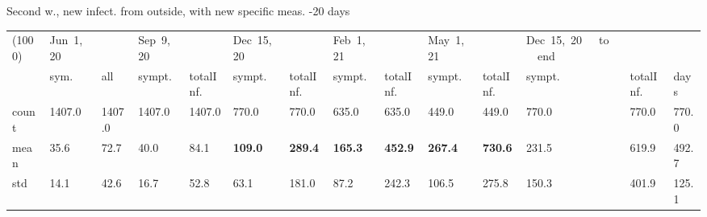 \documentclass[8pt]{beamer}
\begin{document}
\begin{frame}{Second w., new infect. from outside, with new specific meas. -20 days}
\begin{table}[H]
\center
\tiny
\begin{tabular}{p{0.3cm}p{0.3cm}p{0.3cm}p{0.3cm}p{0.3cm}p{0.3cm}p{0.3cm}p{0.3cm}p{0.3cm}p{0.3cm}p{0.3cm}p{0.3cm}p{0.3cm}p{0.4cm}}
\toprule
(1000) &  Jun~1,~20 & &  Sep~9,~20 & & Dec~15,~20 & & Feb~1,~21 & & May~1,~21 & & Dec~15,~20~~~to~~~end   \\
{} &  sym. &  all &  sympt. &  totalInf. &  sympt. &  totalInf. &  sympt. &  totalInf. &  sympt. &  totalInf. &  sympt. &  totalInf.  & days\\
\midrule
count &   1407.0 &                     1407.0 &   1407.0 &                     1407.0 &    770.0 &                      770.0 &    635.0 &                      635.0 &    449.0 &                      449.0 &              770.0 &                   770.0 &  770.0 \\
mean  &     35.6 &                       72.7 &     40.0 &                       84.1 &    \textbf{{\color{red}109.0}} &                      \textbf{{\color{red}289.4}} &    \textbf{{\color{red}165.3}} &                      \textbf{{\color{red}452.9}} &    \textbf{267.4} &                      \textbf{730.6} &               231.5 &                   619.9 &  492.7 \\
std   &     14.1 &                       42.6 &     16.7 &                       52.8 &     63.1 &                      181.0 &     87.2 &                      242.3 &    106.5 &                      275.8 &               150.3 &                   401.9 &  125.1 \\
\bottomrule
\end{tabular}

\label{selForceWave2Contr2M-20Tab}
\end{table}


\end{frame}
\end{document}
